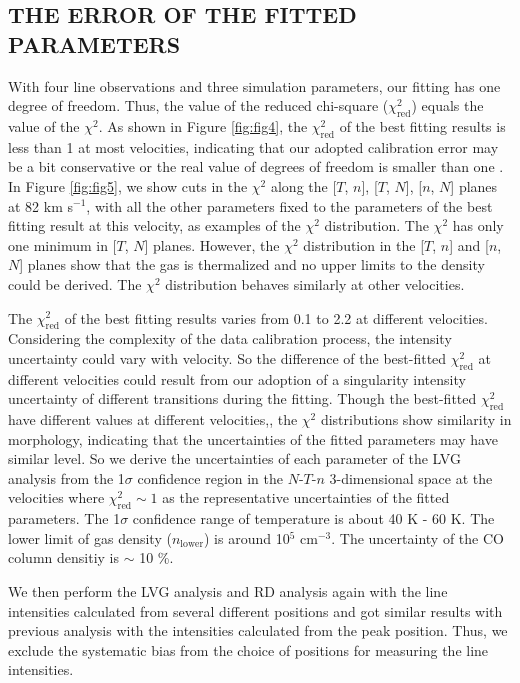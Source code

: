 \subsection{THE ERROR OF THE FITTED PARAMETERS}

With four line observations and three simulation parameters, our fitting has one degree of freedom. Thus, the value of the reduced chi-square ($\chi^2_{\mathrm{red}}$) equals the value of the $\chi^2$. As shown in Figure \ref{fig:fig4}, the $\chi^2_{\mathrm{red}}$ of the best fitting results is less than 1 at most velocities, indicating that our adopted calibration error may be a bit conservative or the real value of degrees of freedom is smaller than one \citep{2010arXiv1012.3754A}. In Figure \ref{fig:fig5}, we show cuts in the $\chi^2$ along the [$T$, $n$], [$T$, $N$], [$n$, $N$] planes at 82 km s$^{-1}$, with all the other parameters fixed to the parameters of the best fitting result at this velocity, as examples of the $\chi^2$ distribution. The $\chi^2$ has only one minimum in [$T$, $N$] planes. However, the $\chi^2$ distribution in the [$T$, $n$] and [$n$, $N$] planes show that the gas is thermalized and no upper limits to the density could be derived. The $\chi^2$ distribution behaves similarly at other velocities. 

The $\chi^2_{\mathrm{red}}$ of the best fitting results varies from 0.1 to 2.2 at different velocities. Considering the complexity of the data calibration process, the intensity uncertainty could vary with velocity. So the difference of the best-fitted $\chi^2_{\mathrm{red}}$ at different velocities could result from our adoption of a singularity intensity uncertainty of different transitions during the fitting. Though the best-fitted $\chi^2_{\mathrm{red}}$ have different values at different velocities,, the $\chi^2$ distributions show similarity in morphology, indicating that the uncertainties of the fitted parameters may have similar level. So we derive the uncertainties of each parameter of the LVG analysis from the 1$\sigma$ confidence region in the $N$-$T$-$n$ 3-dimensional space at the velocities where $\chi^2_{\mathrm{red}} \sim 1$ as the representative uncertainties of the fitted parameters. The 1$\sigma$ confidence range of temperature is about 40 K - 60 K. The lower limit of gas density ($n_{\mathrm{lower}}$) is around 10$^5$ cm$^{-3}$. The uncertainty of the CO column densitiy is $\sim$ 10 \%. 

We then perform the LVG analysis and RD analysis again with the line intensities calculated from several different positions and got similar results with previous analysis with the intensities calculated from the peak position. Thus, we exclude the systematic bias from the choice of positions for measuring the line intensities.
